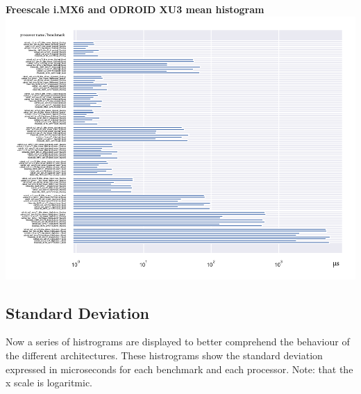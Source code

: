 \textbf{Freescale i.MX6 and ODROID XU3 mean histogram}\newline
\hspace*{-3.2cm}
\includegraphics[width=570pt]{boards_mean_histogram.pdf}
\clearpage




\subsection{Standard Deviation}
Now a series of histrograms are displayed to better comprehend the behaviour of the different architectures.
These histrograms show the standard deviation expressed in microseconds for each benchmark and each processor.
Note: that the x scale is logaritmic.\newline

